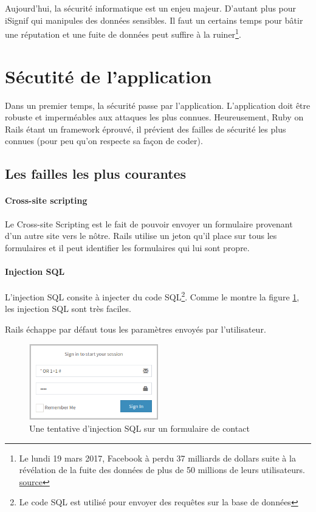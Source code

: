 \documentclass[]{report}
\begin{document}
  Aujourd'hui, la sécurité informatique est un enjeu majeur. D'autant plus pour iSignif qui manipules des données sensibles. Il faut un certains temps pour bâtir une réputation et une fuite de données peut suffire à la ruiner\footnote{Le lundi 19 mars 2017, Facebook à perdu 37 milliards de dollars suite à la révélation de la fuite des données de plus de 50 millions de leurs utilisateurs.  \href{https://www.lci.fr/high-tech/affaire-cambridge-analytica-quel-est-ce-scandale-qui-plonge-facebook-dans-la-crise-mark-zuckerberg-2082228.html}{source}}.

  \section{Sécutité de l'application}

    Dans un premier temps, la sécurité passe par l'application. L'application doit être robuste et imperméables aux attaques les plus connues. Heureusement, Ruby on Rails étant un framework éprouvé, il prévient des failles de sécurité les plus connues (pour peu qu'on respecte sa façon de coder).

    \subsection{Les failles les plus courantes}


      \paragraph{Cross-site scripting}

        Le Cross-site Scripting est le fait de pouvoir envoyer un formulaire provenant d'un autre site vers le nôtre. Rails utilise un jeton qu'il place sur tous les formulaires et il peut identifier les formulaires qui lui sont propre.

      \paragraph{Injection SQL}

        L'injection SQL consite à injecter du code SQL\footnote{Le code SQL est utilisé pour envoyer des requêtes sur la base de données}. Comme le montre la figure \ref{sql_injection}, les injection SQL sont très faciles.

        Rails échappe par défaut tous les paramètres envoyés par l’utilisateur.

        \begin{figure}
          \centering
          \includegraphics[width=0.5\textwidth]{img/sql_injection.png}
          \caption{Une tentative d'injection SQL sur un formulaire de contact}
          \label{sql_injection}
        \end{figure}
\end{document}
